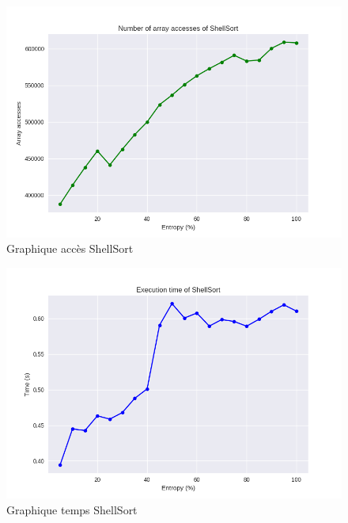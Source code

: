 \documentclass[10pt,a4paper]{article}
\begin{document}
            \begin{figure}
                \centering
                \includegraphics[width=1\textwidth]{graphique/ShellSort/GraphAccessesShellSort.png}
                \caption{Graphique accès ShellSort}
                \label{fig:mesh1}
            \end{figure}
            \begin{figure}
                \centering
                \includegraphics[width=1\textwidth]{graphique/ShellSort/GraphTimeShellSort.png}
                \caption{Graphique temps ShellSort}
                \label{fig:mesh1}
            \end{figure}
\end{document}
